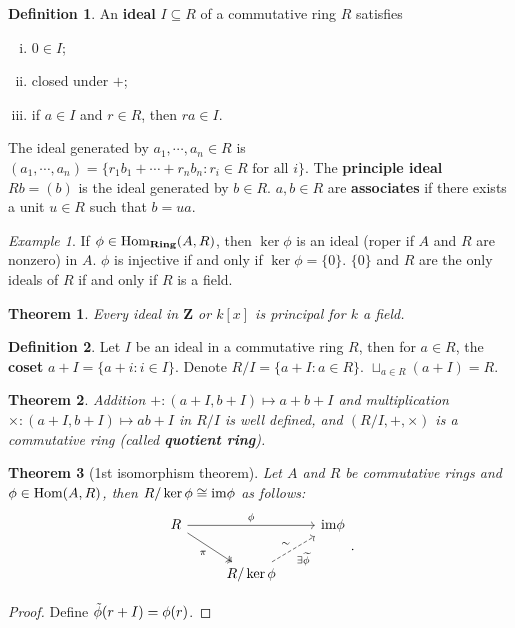 \documentclass[11pt]{article}
\theoremstyle{definition}
\newtheorem*{defin}{Definition}
\theoremstyle{plain}
\newtheorem{theorem}{Theorem}
\theoremstyle{remark}
\newtheorem*{example}{Example}
\newcommand{\Z}{\mathbf{Z}}
\newcommand{\Hom}{\textup{Hom}}
\newcommand{\im}{\textup{im}}
\newcommand{\Ring}{\mathbf{Ring}}
\begin{document}
\begin{defin}
An \textbf{ideal} $I\subseteq R$ of a commutative ring $R$ satisfies\begin{enumerate}[(i)]
    \item $0\in I$;
    \item closed under $+$;
    \item if $a\in I$ and $r\in R$, then $ra\in I$.
\end{enumerate}
The ideal generated by $a_1,\cdots,a_n\in R$ is $(a_1,\cdots,a_n)=\{r_1b_1+\cdots+r_nb_n:r_i\in R\textrm{ for all }i\}$. The \textbf{principle ideal} $Rb=(b)$ is the ideal generated by $b\in R$. $a,b\in R$ are \textbf{associates} if there exists a unit $u\in R$ such that $b=ua$.
\end{defin}

\begin{example}
If $\phi\in\Hom_{\Ring}(A,R)$, then $\ker\phi$ is an ideal (roper if $A$ and $R$ are nonzero) in $A$. $\phi$ is injective if and only if $\ker\phi=\{0\}$. $\{0\}$ and $R$ are the only ideals of $R$ if and only if $R$ is a field.
\end{example}

\begin{theorem}
Every ideal in $\Z$ or $k[x]$ is principal for $k$ a field.
\end{theorem}

\begin{defin}
Let $I$ be an ideal in a commutative ring $R$, then for $a\in R$, the \textbf{coset} $a+I=\{a+i:i\in I\}$. Denote $R/I=\{a+I:a\in R\}$. $\sqcup_{a\in R}(a+I)=R$.
\end{defin}

\begin{theorem}
Addition $+:(a+I,b+I)\mapsto a+b+I$ and multiplication $\times:(a+I,b+I)\mapsto ab+I$ in $R/I$ is well defined, and $(R/I,+,\times)$ is a commutative ring (called \textbf{quotient ring}).
\end{theorem}

\begin{theorem}[1st isomorphism theorem]
Let $A$ and $R$ be commutative rings and $\phi\in\Hom(A,R)$, then $R/\ker\phi\cong\im\phi$ as follows:
\[\begin{tikzcd}
R\arrow[dr,twoheadrightarrow,"\pi",swap]\arrow[rr,"\phi"]&&\im\phi\\
&R/\ker\phi\arrow[ur,dashrightarrow,"\sim","\exists\widetilde{\phi}"']
\end{tikzcd}.\]
\end{theorem}
\begin{proof}
Define $\Tilde{\phi}(r+I)=\phi(r)$.
\end{proof}
\end{document}
